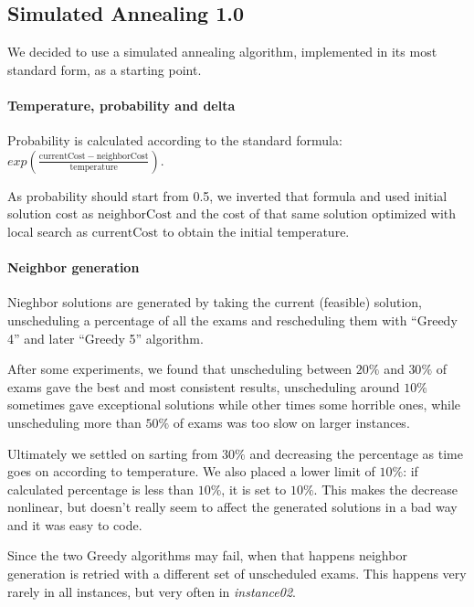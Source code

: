 \documentclass[11pt, a4paper, leqno]{article}
\begin{document}
	\subsection{Simulated Annealing 1.0}
	
	We decided to use a simulated annealing algorithm, implemented in its most standard form, as a starting point.
	
	\paragraph{Temperature, probability and delta}
	
	Probability is calculated according to the standard formula: $exp\left(\frac{\mathrm{currentCost}-\mathrm{neighborCost}}{\mathrm{temperature}}\right)$.
	
	As probability should start from 0.5, we inverted that formula and used initial solution cost as $\mathrm{neighborCost}$ and the cost of that same solution optimized with local search as $\mathrm{currentCost}$ to obtain the initial temperature.
	
	\paragraph{Neighbor generation}
	\label{neighbors}
	
	Nieghbor solutions are generated by taking the current (feasible) solution, unscheduling a percentage of all the exams and rescheduling them with ``Greedy 4'' and later ``Greedy 5'' algorithm.
	
	After some experiments, we found that unscheduling between $20\%$ and $30\%$ of exams gave the best and most consistent results, unscheduling around $10\%$ sometimes gave exceptional solutions while other times some horrible ones, while unscheduling more than $50\%$ of exams was too slow on larger instances.
	
	Ultimately we settled on sarting from $30\%$ and decreasing the percentage as time goes on according to temperature. We also placed a lower limit of $10\%$: if calculated percentage is less than $10\%$, it is set to $10\%$. This makes the decrease nonlinear, but doesn't really seem to affect the generated solutions in a bad way and it was easy to code.
	
	Since the two Greedy algorithms may fail, when that happens neighbor generation is retried with a different set of unscheduled exams. This happens very rarely in all instances, but very often in \textit{instance02}.
	
\end{document}

